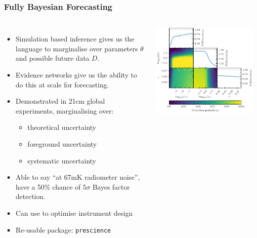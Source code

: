 \documentclass[aspectratio=169]{beamer}
\begin{document}
\appendix
\begin{frame}
    \frametitle{Fully Bayesian Forecasting~}
    \begin{columns}
        \begin{itemize}
            \item Simulation based inference gives us the language to marginalise over parameters $\theta$ and possible future data $D$.
            \item Evidence networks give us the ability to do this at scale for forecasting.
            \item Demonstrated in 21cm global experiments, marginalising over:
                \begin{itemize}
                    \item theoretical uncertainty
                    \item foreground uncertainty
                    \item systematic uncertainty
                \end{itemize}
            \item Able to say ``at 67mK radiometer noise'', have a 50\% chance of 5$\sigma$ Bayes factor detection.
            \item Can use to optimise instrument design
            \item Re-usable package: \texttt{prescience}
        \end{itemize}
        \includegraphics[width=\textwidth]{figures/fbf.pdf}
    \end{columns}
\end{frame}
\end{document}
